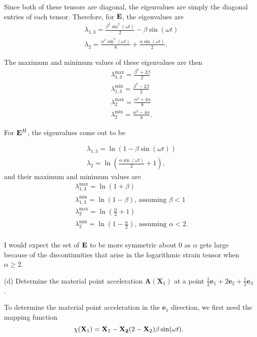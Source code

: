 Since both of these tensors are diagonal, the eigenvalues are simply the diagonal entries of each tensor. Therefore, for $\mathbf{E}$, the eigenvalues are
\begin{align*}
    &\lambda_{1,3} = \frac{\beta^2 \sin^2 (\omega t)}{2} - \beta \sin (\omega t)\\
    &\lambda_2 = \frac{\alpha^2 \sin^2(\omega t)}{8} + \frac{\alpha \sin (\omega t)}{2}.
\end{align*}

The maximum and minimum values of these eigenvalues are then
\begin{align*}
    &\lambda_{1,3}^{\text{max}} = \frac{\beta^2 + 2\beta}{2}\\
    &\lambda_{1,3}^{\text{min}} = \frac{\beta^2 - 2\beta}{2}\\
    &\lambda_2^{\text{max}} = \frac{\alpha^2 + 4\alpha}{8}\\
    &\lambda_2^{\text{min}} = \frac{\alpha^2 - 4\alpha}{8}.
\end{align*}

For $\mathbf{E}^H$, the eigenvalues come out to be

\begin{align*}
    &\lambda_{1,3} = \ln (1 - \beta \sin (\omega t))\\
    &\lambda_2 = \ln \left( \frac{\alpha \sin(\omega t)}{2} +1 \right),
\end{align*}
and their maximum and minimum values are
\begin{align*}
    &\lambda_{1,3}^{\text{max}} = \ln (1 + \beta)\\
    &\lambda_{1,3}^{\text{min}} = \ln (1 - \beta) \text{, assuming $\beta < 1$}\\
    &\lambda_2^{\text{max}} = \ln\left(\frac{\alpha}{2} + 1\right)\\
    &\lambda_2^{\text{min}} = \ln \left( 1 - \frac{\alpha}{2}\right) \text{, assuming $\alpha < 2$}.\\
\end{align*}

I would expect the set of $\mathbf{E}$ to be more symmetric about 0 as $\alpha$ gets large because of the discontinuities that arise in the logarithmic strain tensor when $\alpha \geq 2$.

\medskip
(d) Determine the material point acceleration $\bm{A}(\bm{X}_1)$ at a point $\frac{1}{2} \bm{e}_1 + 2\bm{e}_2 + \frac{1}{2} \bm{e}_3$.

To determine the material point acceleration in the $\bm{e}_1$ direction, we first need the mapping function
\begin{equation*}
    \chi (\mathbf{X}_1) = \mathbf{X}_1 - \mathbf{X_2} (2-\mathbf{X}_2)\beta \sin (\omega t).
\end{equation*}

